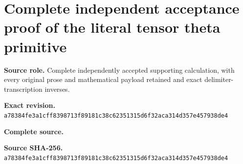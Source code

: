 \begingroup
\sloppy
\small
\section{Complete independent acceptance proof of the literal tensor theta primitive}
\noindent\textbf{Source role.} Complete independently accepted supporting calculation, with every original prose and mathematical payload retained and exact delimiter-transcription inverses.\par
\noindent\textbf{Exact revision.} \nolinkurl{a78384fe3a1cff8398713f89181c38c62351315d6f32aca314d357e457938de4}\par
\noindent\textbf{Complete source.} \par
\noindent\textbf{Source SHA-256.} \nolinkurl{a78384fe3a1cff8398713f89181c38c62351315d6f32aca314d357e457938de4}\par\medskip

\endgroup
